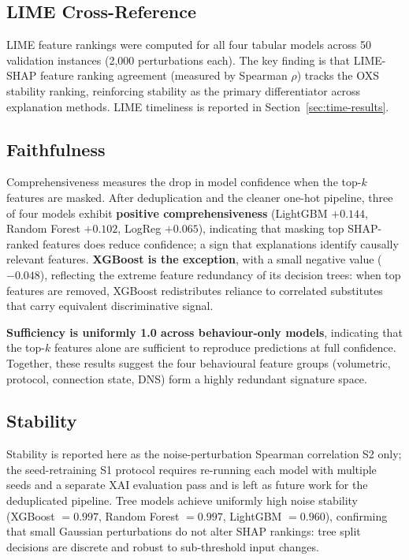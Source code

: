\documentclass[12pt,a4paper]{report}
\begin{document}
\subsection{LIME Cross-Reference}
\label{sec:lime-results}

LIME feature rankings were computed for all four tabular models across 50 validation instances (2,000 perturbations each). The key finding is that LIME-SHAP feature ranking agreement (measured by Spearman $\rho$) tracks the OXS stability ranking, reinforcing stability as the primary differentiator across explanation methods. LIME timeliness is reported in Section~\ref{sec:time-results}.

\subsection{Faithfulness}
\label{sec:faith-results}

Comprehensiveness measures the drop in model confidence when the top-$k$ features are masked. After deduplication and the cleaner one-hot pipeline, three of four models exhibit \textbf{positive comprehensiveness} (LightGBM $+0.144$, Random Forest $+0.102$, LogReg $+0.065$), indicating that masking top SHAP-ranked features does reduce confidence; a sign that explanations identify causally relevant features. \textbf{XGBoost is the exception}, with a small negative value ($-0.048$), reflecting the extreme feature redundancy of its decision trees: when top features are removed, XGBoost redistributes reliance to correlated substitutes that carry equivalent discriminative signal.

\textbf{Sufficiency is uniformly 1.0 across behaviour-only models}, indicating that the top-$k$ features alone are sufficient to reproduce predictions at full confidence. Together, these results suggest the four behavioural feature groups (volumetric, protocol, connection state, DNS) form a highly redundant signature space.

\subsection{Stability}
\label{sec:stab-results}

Stability is reported here as the noise-perturbation Spearman correlation S2 only; the seed-retraining S1 protocol requires re-running each model with multiple seeds and a separate XAI evaluation pass and is left as future work for the deduplicated pipeline. Tree models achieve uniformly high noise stability (XGBoost $= 0.997$, Random Forest $= 0.997$, LightGBM $= 0.960$), confirming that small Gaussian perturbations do not alter SHAP rankings: tree split decisions are discrete and robust to sub-threshold input changes.
\end{document}
